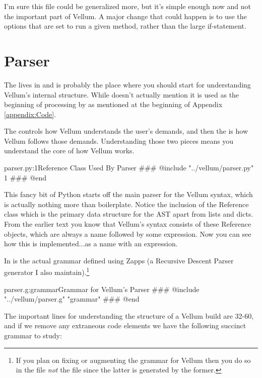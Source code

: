 I'm sure this file could be generalized more, but it's simple enough now and not
the important part of Vellum.  A major change that could happen is to use the
options that are set to run a given method, rather than the large if-statement.




\section{Parser}
\label{appendixA:parser}

The  lives in  and is probably the place where you should
start for understanding Vellum's internal structure.  While 
doesn't actually mention  it is used as the beginning of
processing by  as mentioned at the beginning of Appendix
\ref{appendix:Code}.

The 
controls how Vellum understands the user's demands, and then the 
is how Vellum follows those demands.  Understanding those two pieces means you
understand the core of how Vellum works.

\begin{code}{parser.py:1}{Reference Class Used By Parser}
### @include "../vellum/parser.py" 1
### @end
\end{code}

This fancy bit of Python starts off the main parser for the Vellum syntax, which
is actually nothing more than boilerplate.  Notice the inclusion of the
Reference class which is the primary data structure for the AST apart from lists and
dicts.  From the earlier text you know that Vellum's syntax consists of these
Reference objects, which are always a name followed by some expression.  Now you
can see how this is implemented...as a name with an expression.

In  is the actual grammar defined using Zapps (a Recursive Descent Parser
generator I also maintain).\footnote{If you plan on fixing or augmenting the
    grammar for Vellum then you do so in the  file \emph{not} the
         file since the latter is generated by the former.}

\begin{code}{parser.g:grammar}{Grammar for Vellum's Parser}
### @include "../vellum/parser.g" "grammar"
### @end
\end{code}

The important lines for understanding the structure of a Vellum build are 32-60,
and if we remove any extraneous code elements we have the following succinct
grammar to study:

